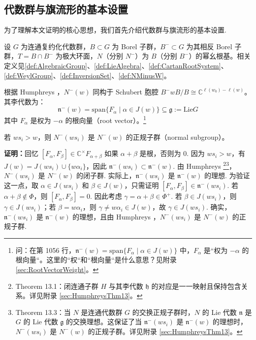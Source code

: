 \subsection{代数群与旗流形的基本设置}
\label{sec:AlgebraicGroupSetup}

为了理解本文证明的核心思想，我们首先介绍代数群与旗流形的基本设置.

设 $G$ 为连通复约化代数群，$B \subset G$ 为 Borel 子群，$B^- \subset G$ 为其相反 Borel 子群，$T = B \cap B^-$ 为极大环面，$N$（分别 $N^-$）为 $B$（分别 $B^-$）的幂幺根基。相关定义见\cref{def:AlgebraicGroup}、\cref{def:LieAlgebra}、\cref{def:CartanRootSystem}、\cref{def:WeylGroup}、\cref{def:InversionSet}、\cref{def:NMinusW}。

根据 Humphreys \cite[Section 28]{humphreys1975}，$N^-(w)$ 同构于 Schubert 胞腔 $B^-wB/B \cong \mathbb{C}^{\ell(w_0) - \ell(w)}$。其李代数为：
$$\mathfrak{n}^-(w) = \mathrm{span}\{F_\alpha \mid \alpha \in J(w)\} \subseteq \mathfrak{g} := \mathrm{Lie} G$$
其中 $F_\alpha$ 是权为 $-\alpha$ 的根向量（root vector）。\footnote{问：在第 1056 行，$\mathfrak{n}^-(w) = \mathrm{span}\{F_\alpha \mid \alpha \in J(w)\}$ 中，$F_\alpha$ 是``权为 $-\alpha$ 的根向量``。这里的``权``和``根向量``是什么意思？见附录 \cref{sec:RootVectorWeight}。}

\begin{Lemma}
\label{def:Lemma22}
若 $ws_i > w$，则 $N^-(ws_i)$ 是 $N^-(w)$ 的正规子群（normal subgroup）。



\textbf{证明：}回忆 $[F_\alpha, F_\beta] \in \mathbb{C}^\times F_{\alpha+\beta}$ 如果 $\alpha + \beta$ 是根，否则为 $0$. 因为 $ws_i > w$，有 $J(w) = J(ws_i) \cup \{w\alpha_i\}$，因此 $\mathfrak{n}^-(ws_i) \subset \mathfrak{n}^-(w)$. 由 Humphreys \cite[Theorem 13.1 and Theorem 13.3]{humphreys1975}\footnote{Theorem 13.1：闭连通子群 $H$ 与其李代数 $\mathfrak{h}$ 的对应是一一映射且保持包含关系。详见附录 \cref{sec:HumphreysThm13}。}\footnote{Theorem 13.3：当 $N$ 是连通代数群 $G$ 的交换正规子群时，$N$ 的 Lie 代数 $\mathfrak{n}$ 是 $G$ 的 Lie 代数 $\mathfrak{g}$ 的交换理想。这保证了当 $\mathfrak{n}^-(ws_i)$ 是 $\mathfrak{n}^-(w)$ 的理想时，$N^-(ws_i)$ 是 $N^-(w)$ 的正规子群。详见附录 \cref{sec:HumphreysThm13}。}，$N^-(ws_i)$ 是 $N^-(w)$ 的闭子群. 实际上，$\mathfrak{n}^-(ws_i)$ 是 $\mathfrak{n}^-(w)$ 的理想. 为验证这一点，取 $\alpha \in J(ws_i)$ 和 $\beta \in J(w)$，只需证明 $[F_\alpha, F_\beta] \in \mathfrak{n}^-(ws_i)$. 若 $\alpha + \beta \notin \Phi$，则 $[F_\alpha, F_\beta] = 0$. 因此考虑 $\gamma = \alpha + \beta \in \Phi^+$. 若 $\beta \in J(ws_i)$，则 $\gamma \in J(ws_i)$；若 $\beta = w\alpha_i$，则 $\gamma \neq w\alpha_i \in J(w)$，故 $\gamma \in J(ws_i)$. 确实，$\mathfrak{n}^-(ws_i)$ 是 $\mathfrak{n}^-(w)$ 的理想，且由 Humphreys \cite[Theorem 13.3]{humphreys1975}，$N^-(ws_i)$ 是 $N^-(w)$ 的正规子群.
\end{Lemma}

